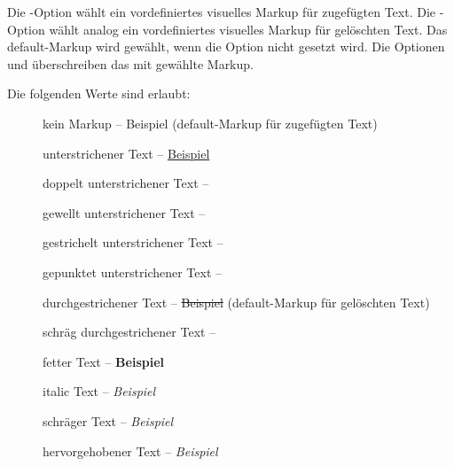 Die -Option wählt ein vordefiniertes visuelles Markup für zugefügten Text.
Die -Option wählt analog ein vordefiniertes visuelles Markup für gelöschten Text.
Das default-Markup wird gewählt, wenn die Option nicht gesetzt wird.
Die Optionen  und  überschreiben das mit  gewählte Markup.

Die folgenden Werte sind erlaubt:
\begin{description}
	\item [] kein Markup -- Beispiel (default-Markup für zugefügten Text)
	\item [] unterstrichener Text -- \uline{Beispiel}
	\item [] doppelt unterstrichener Text -- 
	\item [] gewellt unterstrichener Text -- 
	\item [] gestrichelt unterstrichener Text -- 
	\item [] gepunktet unterstrichener Text -- 
	\item [] durchgestrichener Text -- \sout{Beispiel} (default-Markup für gelöschten Text)
	\item [] schräg durchgestrichener Text -- 
	\item [] fetter Text -- \textbf{Beispiel}
	\item [] italic Text -- \textit{Beispiel}
	\item [] schräger Text -- \textsl{Beispiel}
	\item [] hervorgehobener Text -- \emph{Beispiel}
\end{description}

\begin{chusage}
		\>\\
	\usageexample
		\> \Corresponds\ \\
		\>\\
\end{chusage}

\begin{chusage}
		\>\\
	\usageexample
		\> \Corresponds\ \\
		\>\\
		\>
\end{chusage}



